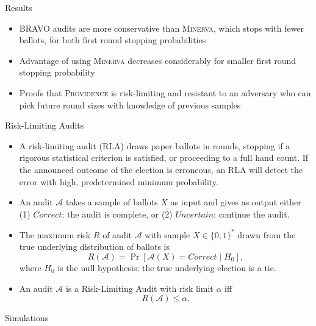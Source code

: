 \documentclass[final]{beamer}
\newcommand{\Minerva}{\textsc{Minerva}\xspace}
\newcommand{\Prov}{\textsc{Providence}\xspace}
\newcommand{\BRAVO}{\textsc{BRAVO}\xspace}
\newlength{\colwidth}
\begin{document}
\begin{frame}[t]
\begin{columns}[t]
\begin{column}{\colwidth}
\begin{block}{Results}

\begin{itemize}
\item \BRAVO audits are more conservative than \Minerva, which stops with fewer ballots, for both first round stopping probabilities
\item Advantage of using \Minerva decreases considerably for smaller first round stopping probability
\item Proofs that \Prov is risk-limiting and resistant to an adversary who can pick future round sizes with knowledge of previous samples
\end{itemize}
\end{block}

\begin{block}{Risk-Limiting Audits}

\begin{itemize}
\item
A risk-limiting audit (RLA) draws paper ballots in rounds, stopping if a rigorous statistical criterion is satisfied, or proceeding to a full hand count. If the announced outcome of the election is erroneous, an RLA will detect the error with high, predetermined minimum probability. 
\item
An audit $\mathcal{A}$ takes a sample of ballots $X$ as input and gives as output either
(1) $Correct$: the audit is complete, or (2) $Uncertain$: continue the audit.
\item
The maximum risk $R$ of audit $\mathcal{A}$ with sample $X\in \{0,1\}^*$ drawn from 
the true underlying distribution of ballots is
$$R(\mathcal{A})=\Pr[\mathcal{A}(X)=Correct \mid H_0],$$ where $H_0$ is the null
hypothesis: the true underlying election is a tie.
\item
An audit $\mathcal{A}$ is a Risk-Limiting Audit with 
risk limit $\alpha$ iff 
$$R(\mathcal{A}) \le \alpha.$$
\end{itemize}
\end{block}

\begin{block}{Simulations}


\end{block}
\end{column}
\end{columns}
\end{frame}
\end{document}
